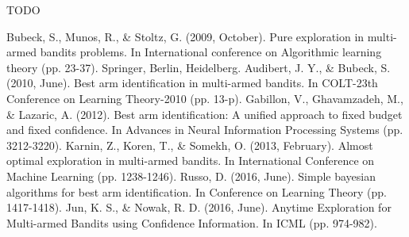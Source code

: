 \documentclass[runningheads,a4paper]{llncs}
\begin{document}
TODO

\begin{thebibliography}{4}

 Bubeck, S., Munos, R., \& Stoltz, G. (2009, October). Pure exploration in multi-armed bandits problems. In International conference on Algorithmic learning theory (pp. 23-37). Springer, Berlin, Heidelberg.
 Audibert, J. Y., \& Bubeck, S. (2010, June). Best arm identification in multi-armed bandits. In COLT-23th Conference on Learning Theory-2010 (pp. 13-p).
 Gabillon, V., Ghavamzadeh, M., \& Lazaric, A. (2012). Best arm identification: A unified approach to fixed budget and fixed confidence. In Advances in Neural Information Processing Systems (pp. 3212-3220).
 Karnin, Z., Koren, T., \& Somekh, O. (2013, February). Almost optimal exploration in multi-armed bandits. In International Conference on Machine Learning (pp. 1238-1246).
 Russo, D. (2016, June). Simple bayesian algorithms for best arm identification. In Conference on Learning Theory (pp. 1417-1418).
 Jun, K. S., \& Nowak, R. D. (2016, June). Anytime Exploration for Multi-armed Bandits using Confidence Information. In ICML (pp. 974-982).

\end{thebibliography}


\end{document}
